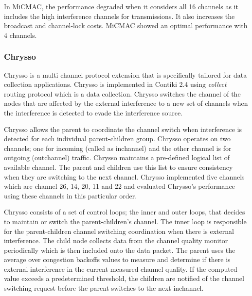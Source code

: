 In MiCMAC, the performance degraded when it considers all 16 channels as it includes the high interference channels for transmissions. It also increases the broadcast and channel-lock costs. MiCMAC showed an optimal performance with 4 channels. 



\subsubsection{Chrysso}
Chrysso \cite{chrysso} is a multi channel protocol extension that is specifically tailored for data collection applications. Chrysso is implemented in Contiki 2.4 using \textit{collect} routing protocol which is a data collection. Chrysso switches the channel of the nodes that are affected by the external interference to a new set of channels when the interference is detected to evade the interference source.

Chrysso allows the parent to coordinate the channel switch when interference is detected for each individual parent-children group. Chrysso operates on two channels; one for incoming (called as inchannel) and the other channel is for outgoing (outchannel) traffic. Chrysso maintains a pre-defined logical list of available channel. The parent and children use this list to ensure consistency when they are switching to the next channel. Chrysso implemented five channels which are channel 26, 14, 20, 11 and 22 and evaluated Chrysso's performance using these channels in this particular order.

Chrysso consists of a set of control loops; the inner and outer loops, that decides to maintain or switch the parent-children's channel. The inner loop is responsible for the parent-children channel switching coordination when there is external interference. The child node collects data from the channel quality monitor periodically which is then included onto the data packet. The parent uses the average over congestion backoffs values to measure and determine if there is external interference in the current measured channel quality. If the computed value exceeds a predetermined threshold, the children are notified of the channel switching request before the parent switches to the next inchannel.

